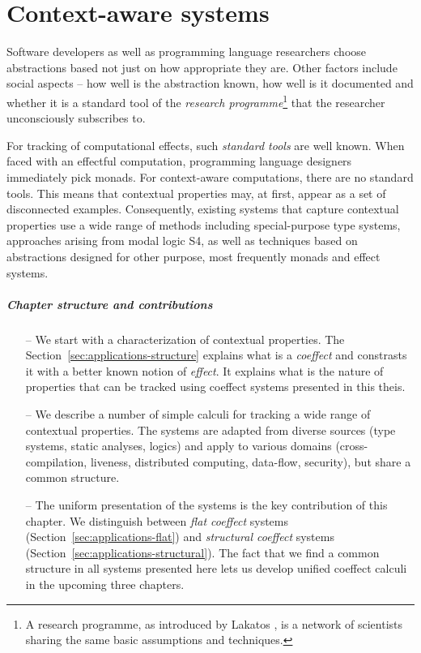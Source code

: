 

\chapter{Context-aware systems} 
\label{ch:applications} 

Software developers as well as programming language researchers choose abstractions based not 
just on how appropriate they are. Other factors include social aspects -- how well is the 
abstraction known, how well is it documented and whether it is a standard tool of the
\emph{research programme}\footnote{A research programme, as introduced by Lakatos \cite{philosophy-lakatos},
is a network of scientists sharing the same basic assumptions and techniques.} that the researcher
unconsciously subscribes to. 

For tracking of computational effects, such \emph{standard tools} are well known. When 
faced with an effectful computation, programming language designers immediately pick monads. For 
context-aware computations, there are no standard tools. This means that contextual properties may, 
at first, appear as a set of disconnected examples. Consequently, existing systems that capture 
contextual properties use a wide range of methods including special-purpose type systems,  
approaches arising from modal logic S4, as well as techniques based on abstractions designed for other 
purpose, most frequently monads and effect systems.

\paragraph{Chapter structure and contributions}
\begin{itemize}
\item[--] We start with a characterization of contextual properties. The Section~\ref{sec:applications-structure}
  explains what is a \emph{coeffect} and constrasts it with a better known notion of 
  \emph{effect}. It explains what is the nature of properties that can be tracked using 
  coeffect systems presented in this theis.

\item[--] We describe a number of simple calculi for tracking a wide range of contextual properties. 
  The systems are adapted from diverse sources (type systems, static analyses, logics) and apply to
  various domains (cross-compilation, liveness, distributed computing, data-flow, security), but
  share a common structure.

\item[--] The uniform presentation of the systems is the key contribution of this chapter. We distinguish
  between \emph{flat coeffect} systems (Section~\ref{sec:applications-flat}) and \emph{structural coeffect}
  systems (Section~\ref{sec:applications-structural}). The fact that we find a common structure in
  all systems presented here lets us develop unified coeffect calculi in the upcoming three chapters.
\end{itemize}

